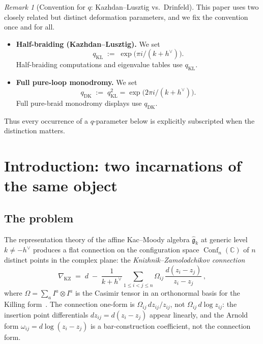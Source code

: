 \documentclass[11pt,reqno]{amsart}
\theoremstyle{definition}
\theoremstyle{remark}
\newtheorem{remark}[theorem]{Remark}
\DeclareMathOperator{\Conf}{Conf}
\newcommand{\fg}{\mathfrak{g}}
\newcommand{\CC}{\mathbb{C}}
\newcommand{\hv}{h^{\vee}}
\newcommand{\kp}{k + h^{\vee}}
\numberwithin{equation}{section}
\begin{document}
\maketitle

\setcounter{tocdepth}{2}
\tableofcontents

\begin{remark}[Convention for $q$: Kazhdan--Lusztig vs.\ Drinfeld]
\label{rem:dk-q-convention}
This paper uses two closely related but distinct deformation
parameters, and we fix the convention once and for all.
\begin{itemize}
\item \textbf{Half-braiding (Kazhdan--Lusztig).} We set
\[
  q_{\mathrm{KL}} \;:=\; \exp\!\bigl(\pi i/(k+\hv)\bigr).
\]
Half-braiding computations and eigenvalue tables use
$q_{\mathrm{KL}}$.
\item \textbf{Full pure-loop monodromy.} We set
\[
  q_{\mathrm{DK}} \;:=\; q_{\mathrm{KL}}^2
  = \exp\!\bigl(2\pi i/(k+\hv)\bigr).
\]
Full pure-braid monodromy displays use \(q_{\mathrm{DK}}\).
\end{itemize}
Thus every occurrence of a \(q\)-parameter below is explicitly
subscripted when the distinction matters.
\end{remark}

\section{Introduction: two incarnations of the same object}
\label{sec:dk-intro}

\subsection{The problem}

The representation theory of the affine Kac--Moody algebra
$\widehat{\fg}_k$ at generic level $k \neq -\hv$ produces
a flat connection on the configuration space
$\Conf_n(\CC)$ of $n$ distinct points in the complex
plane: the \emph{Knizhnik--Zamolodchikov connection}
\begin{equation}\label{eq:dk-kz-intro}
\nabla_{\mathrm{KZ}}
\;=\;
d
\;-\;
\frac{1}{\kp}
\sum_{1 \leq i < j \leq n}
\Omega_{ij}\,\frac{d(z_i - z_j)}{z_i - z_j}\,,
\end{equation}
where $\Omega = \sum_a I^a \otimes I^a$ is the Casimir
tensor in an orthonormal basis for the Killing
form~\cite{KZ84}.  The connection one-form is
$\Omega_{ij}\,dz_{ij}/z_{ij}$, not
$\Omega_{ij}\,d\log z_{ij}$: the insertion point
differentials $dz_{ij} = d(z_i - z_j)$ appear linearly,
and the Arnold form
$\omega_{ij} = d\log(z_i - z_j)$ is a bar-construction
coefficient, not the connection form.
\end{document}
